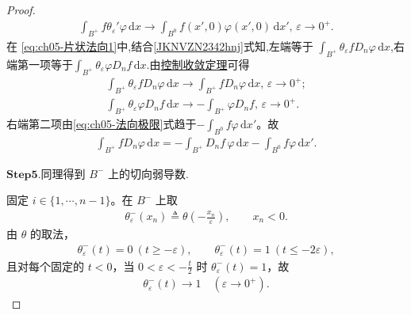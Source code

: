 \documentclass[../../main.tex]{subfiles}
\begin{document}
\begin{proof}
\begin{align}
\int_{B^{+}}f\theta_{\varepsilon}'\varphi\,\mathrm{d}x
\longrightarrow\int_{B^{0}}f(x',0)\varphi(x',0)\,\mathrm{d}x',\, \varepsilon \to 0^+.
\label{eq:ch05-法向极限}
\end{align}
在 \eqref{eq:ch05-片状法向1}中,结合\eqref{JKNVZN2342hnj}式知,左端等于 $\int_{B^{+}}\theta_{\varepsilon}fD_n\varphi\,\mathrm{d}x$,右端第一项等于$\int_{B^+}{\theta _{\varepsilon}\varphi D_nf\,\mathrm{d}x}$.由\hyperref[Real Analysis-theorem:控制收敛定理]{控制收敛定理}可得
\begin{gather*}
\int_{B^+}{\theta _{\varepsilon}fD_n\varphi \,\mathrm{d}x}\rightarrow \int_{B^+}{fD_n\varphi \,\mathrm{d}x},\,\varepsilon \rightarrow 0^+;
\\
\int_{B^+}{\theta _{\varepsilon}\varphi D_nf\,\mathrm{d}x}\rightarrow -\int_{B^+}{\varphi D_nf},\,\varepsilon \rightarrow 0^+.
\end{gather*}
右端第二项由\eqref{eq:ch05-法向极限}式趋于$-\int_{B^{0}}f\varphi\,\mathrm{d}x'$。故
\begin{align}
\int_{B^{+}}fD_n\varphi\,\mathrm{d}x
=-\int_{B^{+}}D_nf\,\varphi\,\mathrm{d}x
-\int_{B^{0}}f\varphi\,\mathrm{d}x'.
\label{eq:ch05-片状法向+}
\end{align}

\noindent$\mathbf{Step}\bm{5}$.{\heiti 同理得到 $B^{-}$ 上的切向弱导数.}

固定 $i\in\{1,\cdots,n-1\}$。在 $B^{-}$ 上取
\begin{align*}
\theta_{\varepsilon}^{-}(x_n)\triangleq\theta\left(-\frac{x_n}{\varepsilon}\right),\qquad x_n<0.
\end{align*}
由 $\theta$ 的取法，
\begin{align}
\theta_{\varepsilon}^{-}(t)=0\ (t\geqslant-\varepsilon),\qquad
\theta_{\varepsilon}^{-}(t)=1\ (t\leqslant-2\varepsilon),
\label{eq:ch05-片状负切向theta性质}
\end{align}
且对每个固定的 $t<0$，当 $0<\varepsilon<-\frac{t}{2}$ 时 $\theta_{\varepsilon}^{-}(t)=1$，故
\begin{align}
\theta_{\varepsilon}^{-}(t)\longrightarrow1\quad(\varepsilon\to0^{+}).
\label{eq:ch05-片状负切向theta极限}
\end{align}


\end{proof}
\end{document}
